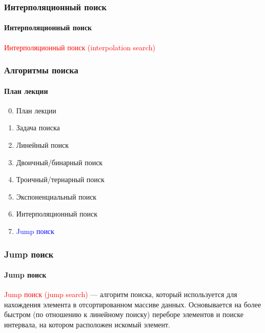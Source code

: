 \documentclass[aspectratio=169]{beamer}
\begin{document}
\begin{frame}
\frametitle{Интерполяционный поиск}
\framesubtitle{Интерполяционный поиск}
\justifying
\textcolor{red}{Интерполяционный поиск (interpolation search)}

\begin{figure}
    \captionsetup[subfigure]{labelformat=empty}
    \centering
\end{figure}

\end{frame}

\begin{frame}
\frametitle{Алгоритмы поиска}
\framesubtitle{План лекции}

\begin{enumerate}
  \setcounter{enumi}{-1}
  \item{План лекции}
  \item{Задача поиска}
  \item{Линейный поиск}
  \item{Двоичный/бинарный поиск}
  \item{Троичный/тернарный поиск}
  \item{Экспоненциальный поиск}
  \item{Интерполяционный поиск}
  \item{\textcolor{blue}{Jump поиск}}
\end{enumerate}
\end{frame}

\begin{frame}
\frametitle{Jump поиск}
\framesubtitle{Jump поиск}
\justifying
\textcolor{red}{Jump поиск (jump search)} — алгоритм поиска, который используется для нахождения элемента в отсортированном массиве данных. \newline\newline Основывается на более быстром (по отношению к линейному поиску) переборе элементов и поиске интервала, на котором расположен искомый элемент.

\begin{figure}
    \captionsetup[subfigure]{labelformat=empty}
    \centering
\end{figure}
\end{frame}
\end{document}
